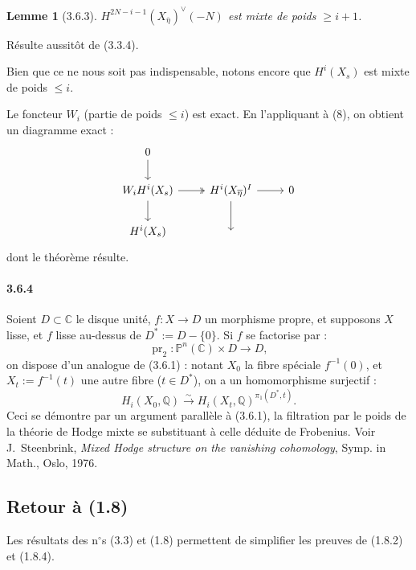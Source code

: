 \documentclass[12pt,a4paper]{article}
\theoremstyle{plain}
\newtheorem{lemma}[theorem]{Lemme}
\theoremstyle{definition}
\theoremstyle{remark}
\DeclareMathOperator{\pr}{pr}
\newcommand{\CC}{{\mathbb{C}}}
\newcommand{\QQ}{{\mathbb{Q}}}
\newcommand{\PP}{{\mathbb{P}}}
\begin{document}
\begin{lemma}[3.6.3]
$H^{2N-i-1}(X_{\overline{\eta}})^\vee(-N)$ est mixte de poids $\geq i + 1$.
\end{lemma}

R\'esulte aussit\^ot de (3.3.4).

Bien que ce ne nous soit pas indispensable, notons encore que $H^i(X_s)$ est mixte de poids $\leq i$.

Le foncteur $W_i$ (partie de poids $\leq i$) est exact. En l'appliquant \`a (8), on obtient un diagramme exact :
\[
\begin{tikzcd}
0 \arrow[d] \\
W_i H^i(X_s) \arrow[r, two heads] \arrow[d] & H^i(X_{\overline{\eta}})^I \arrow[r] \arrow[d] & 0 \\
H^i(X_s) & {} & {}
\end{tikzcd}
\]
dont le th\'eor\`eme r\'esulte.

\paragraph{3.6.4}
Soient $D \subset \CC$ le disque unit\'e, $f : X \to D$ un morphisme propre, et supposons $X$ lisse, et $f$ lisse au-dessus de $D^* := D - \{0\}$. Si $f$ se factorise par :
\[ \pr_2 : \PP^n(\CC) \times D \to D, \]
on dispose d'un analogue de (3.6.1) : notant $X_0$ la fibre sp\'eciale $f^{-1}(0)$, et $X_t := f^{-1}(t)$ une autre fibre ($t \in D^*$), on a un homomorphisme surjectif :
\[ H_i(X_0, \QQ) \xrightarrow{\sim} H_i(X_t, \QQ)^{\pi_1(D^*, t)}. \]
Ceci se d\'emontre par un argument parall\`ele \`a (3.6.1), la filtration par le poids de la th\'eorie de Hodge mixte se substituant \`a celle d\'eduite de Frobenius. Voir J.~Steenbrink, \textit{Mixed Hodge structure on the vanishing cohomology}, Symp. in Math., Oslo, 1976.



\subsection{Retour \`a (1.8)}

Les r\'esultats des n$^\circ$s (3.3) et (1.8) permettent de simplifier les preuves de (1.8.2) et (1.8.4).
\end{document}
